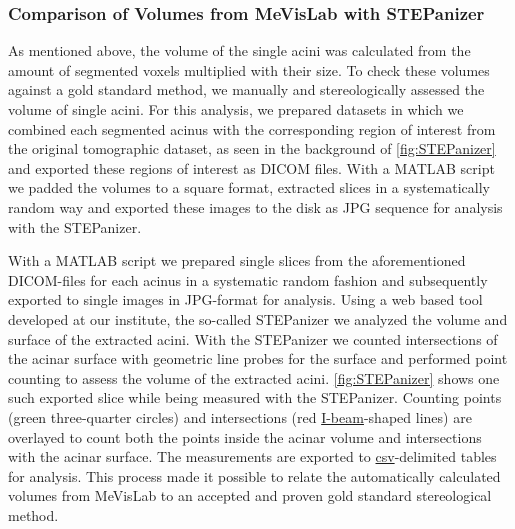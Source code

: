 \documentclass[%
	paper=a4,%
	abstract=true,%
	]{scrartcl}
\begin{document}
\subsubsection{Comparison of Volumes from MeVisLab with STEPanizer}
As mentioned above, the volume of the single acini was calculated from the amount of segmented voxels multiplied with their size. To check these volumes against a gold standard method, we manually and stereologically assessed the volume of single acini. For this analysis, we prepared datasets in which we combined each segmented acinus with the corresponding region of interest from the original tomographic dataset, as seen in the background of \autoref{fig:STEPanizer} and exported these regions of interest as DICOM files. With a MATLAB script we padded the volumes to a square format, extracted slices in a systematically random way and exported these images to the disk as JPG sequence for analysis with the STEPanizer. 

With a MATLAB script we prepared single slices from the aforementioned DICOM-files for each acinus in a systematic random fashion and subsequently exported to single images in JPG-format for analysis. Using a web based tool developed at our institute, the so-called STEPanizer \cite[provided free of charge at \url{http://stepanizer.com}]{Tschanz2011} we analyzed the volume and surface of the extracted acini. With the STEPanizer we counted intersections of the acinar surface with geometric line probes for the surface and performed point counting to assess the volume of the extracted acini. \autoref{fig:STEPanizer} shows one such exported slice while being measured with the STEPanizer. Counting points (green three-quarter circles) and intersections (red \href{http://www.dict.cc/englisch-deutsch/I-beam.html}{I-beam}-shaped lines) are overlayed to count both the points inside the acinar volume and intersections with the acinar surface. The measurements are exported to \href{https://secure.wikimedia.org/wikipedia/en/w/index.php?title=Comma-separated_values&oldid=441921632}{csv}-delimited tables for analysis. This process made it possible to relate the automatically calculated volumes from MeVisLab to an accepted and proven gold standard stereological method.
\end{document}
